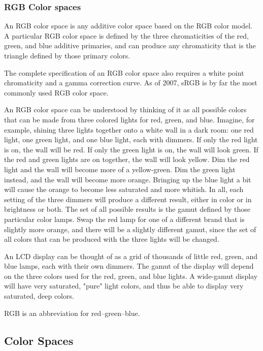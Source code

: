 \documentclass[BTech]{srmuthesis}
\begin{document}
\subsubsection{RGB Color spaces}

An RGB color space is any additive color space based on the RGB color model. A particular RGB color space is defined by the three chromaticities of the red, green, and blue additive primaries, and can produce any chromaticity that is the triangle defined by those primary colors. 

The complete specification of an RGB color space also requires a white point chromaticity and a gamma correction curve. As of 2007, sRGB is by far the most commonly used RGB color space.

An RGB color space can be understood by thinking of it as all possible colors that can be made from three colored lights for red, green, and blue. Imagine, for example, shining three lights together onto a white wall in a dark room: one red light, one green light, and one blue light, each with dimmers. If only the red light is on, the wall will be red. If only the green light is on, the wall will look green. If the red and green lights are on together, the wall will look yellow. Dim the red light and the wall will become more of a yellow-green. Dim the green light instead, and the wall will become more orange. Bringing up the blue light a bit will cause the orange to become less saturated and more whitish. In all, each setting of the three dimmers will produce a different result, either in color or in brightness or both. The set of all possible results is the gamut defined by those particular color lamps. Swap the red lamp for one of a different brand that is slightly more orange, and there will be a slightly different gamut, since the set of all colors that can be produced with the three lights will be changed.

An LCD display can be thought of as a grid of thousands of little red, green, and blue lamps, each with their own dimmers. The gamut of the display will depend on the three colors used for the red, green, and blue lights. A wide-gamut display will have very saturated, "pure" light colors, and thus be able to display very saturated, deep colors.

RGB is an abbreviation for red–green–blue.

\subsection{Color Spaces}
\end{document}
